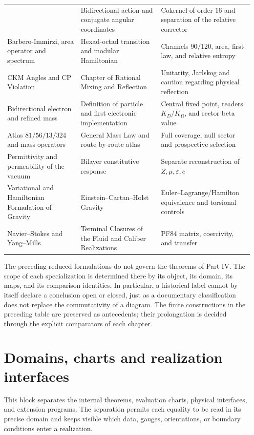 \begin{longtable}{@{}>{\raggedright\arraybackslash}p{}
  >{\raggedright\arraybackslash}p{}
  >{\raggedright\arraybackslash}p{}@{}}
& Bidirectional action and conjugate angular coordinates
& Cokernel of order $16$ and separation of the relative corrector\\
Barbero-Immirzi, area operator and spectrum
& Hexad-octad transition and modular Hamiltonian
& Channels $90/120$, area, first law, and relative entropy\\
CKM Angles and CP Violation
& Chapter of Rational Mixing and Reflection
& Unitarity, Jarlskog and caution regarding physical reflection\\
Bidirectional electron and refined mass
& Definition of particle and first electronic implementation
& Central fixed point, readers $K_D/K_\Omega$, and rector beta value\\
Atlas \(81/56/13/324\) and mass operators
& General Mass Law and route-by-route atlas
& Full coverage, null sector and prospective selection\\
Permittivity and permeability of the vacuum
& Bilayer constitutive response
& Separate reconstruction of \(Z,\mu,\varepsilon,c\)\\
Variational and Hamiltonian Formulation of Gravity
& Einstein--Cartan--Holst Gravity
& Euler--Lagrange/Hamilton equivalence and torsional controls\\
Navier--Stokes and Yang--Mills
& Terminal Closures of the Fluid and Caliber Realizations
& PF84 matrix, coercivity, and transfer\\
\bottomrule
\end{longtable}
\endgroup

The preceding reduced formulations do not govern the theorems of
Part IV. The scope of each specialization is determined there by its object,
its domain, its maps, and its comparison identities. In particular, a
historical label cannot by itself declare a conclusion open or
closed, just as a documentary classification does not replace the
commutativity of a diagram. The finite constructions in the preceding table
are preserved as antecedents; their prolongation is decided through the
explicit comparators of each chapter.

\chapter{Domains, charts and realization interfaces}
\label{app:dominios-cartas-interfaces-acumulativo}

This block separates the internal theorems, evaluation charts,
physical interfaces, and extension programs. The separation permits each
equality to be read in its precise domain and keeps visible which data, gauges,
orientations, or boundary conditions enter a realization.

